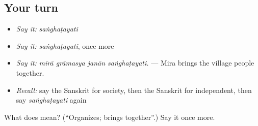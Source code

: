 \subsection*{Your turn}
\begin{itemize}
\raggedright
  \item \emph{Say it:} \emph{saṅghaṭayati}
  \item \emph{Say it:} \emph{saṅghaṭayati}, once more
  \item \emph{Say it:} \emph{mīrā grāmasya janān saṅghaṭayati.} — Mira brings the village people together.
  \item \emph{Recall:} say the Sanskrit for society, then the Sanskrit for independent, then say \emph{saṅghaṭayati} again
\end{itemize}

\begin{tcolorbox}[breakable,colback=teal!4,colframe=teal!35!black,title={Before you move on}]
What does  mean? (\textquotedblleft{}Organizes; brings together\textquotedblright{}.) Say it once more.
\end{tcolorbox}

